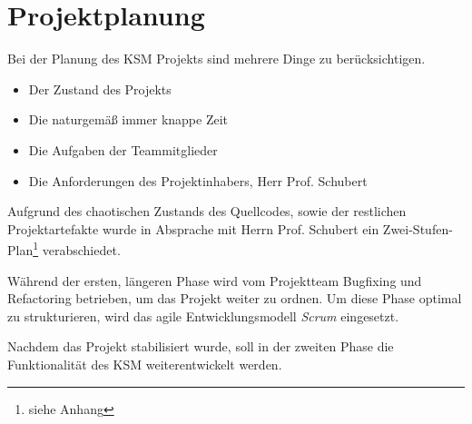 \section{Projektplanung} \label{planung}

Bei der Planung des KSM Projekts sind mehrere Dinge zu berücksichtigen. 
\begin{itemize}
\item Der Zustand des Projekts
\item Die naturgemäß immer knappe Zeit
\item Die Aufgaben der Teammitglieder
\item Die Anforderungen des Projektinhabers, Herr Prof. Schubert
\end{itemize}

Aufgrund des chaotischen Zustands des Quellcodes, sowie der restlichen Projektartefakte wurde in Absprache mit Herrn Prof. Schubert ein Zwei-Stufen-Plan\footnote{siehe Anhang} verabschiedet. 

Während der ersten, längeren Phase wird vom Projektteam Bugfixing und Refactoring betrieben, um das Projekt weiter zu ordnen. Um diese Phase optimal zu strukturieren, wird das agile Entwicklungsmodell \emph{Scrum} eingesetzt.

Nachdem das Projekt stabilisiert wurde, soll in der zweiten Phase die Funktionalität des KSM weiterentwickelt werden. 